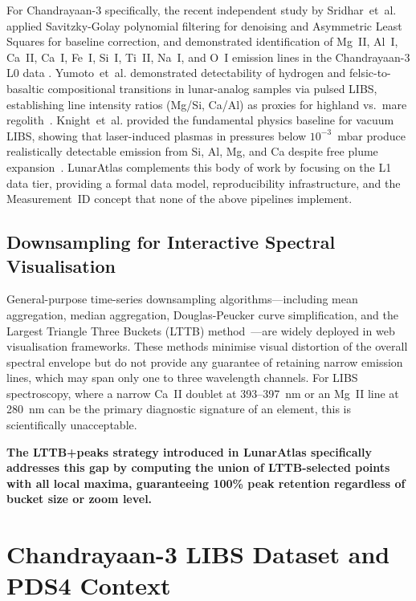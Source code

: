 \documentclass[a4paper,twocolumn,10pt]{article}
\begin{document}
For Chandrayaan-3 specifically, the recent independent study by
Sridhar~et~al. applied Savitzky-Golay polynomial filtering for
denoising and Asymmetric Least Squares for baseline correction, and
demonstrated identification of Mg~II, Al~I, Ca~II, Ca~I, Fe~I, Si~I,
Ti~II, Na~I, and O~I emission lines in the Chandrayaan-3 L0 data
\cite{Sridhar2025}.  Yumoto~et~al. demonstrated detectability of
hydrogen and felsic-to-basaltic compositional transitions in
lunar-analog samples via pulsed LIBS, establishing line intensity
ratios (Mg/Si, Ca/Al) as proxies for highland vs.\ mare
regolith~\cite{Yumoto2023}.  Knight~et~al. provided the
fundamental physics baseline for vacuum LIBS, showing that
laser-induced plasmas in pressures below $10^{-3}$~mbar produce
realistically detectable emission from Si, Al, Mg, and Ca despite
free plume expansion~\cite{Knight2000}.
LunarAtlas complements this body of work by focusing on
the L1 data tier, providing a formal data model, reproducibility
infrastructure, and the Measurement~ID concept that none of the
above pipelines implement.

\subsection{Downsampling for Interactive Spectral Visualisation}

General-purpose time-series downsampling algorithms---including mean
aggregation, median aggregation, Douglas-Peucker curve simplification,
and the Largest Triangle Three Buckets (LTTB) method~\cite{
Steinarsson2013}---are widely deployed in web visualisation frameworks.
These methods minimise visual distortion of the overall spectral
envelope but do not provide any guarantee of retaining narrow emission
lines, which may span only one to three wavelength channels.  For LIBS
spectroscopy, where a narrow Ca~II doublet at 393--397~nm or an Mg~II
line at 280~nm can be the primary diagnostic signature of an element,
this is scientifically unacceptable.

\textbf{The LTTB+peaks strategy introduced in LunarAtlas specifically
addresses this gap by computing the union of LTTB-selected points with
all local maxima, guaranteeing 100\% peak retention regardless of bucket
size or zoom level.}


\section{Chandrayaan-3 LIBS Dataset and PDS4 Context}
\label{sec:data}
\end{document}
